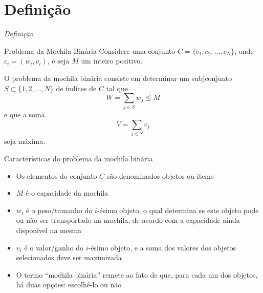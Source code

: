 \section{Definição}

\begin{frame}[fragile]{{\it Definição}}

    \begin{block}{Problema da Mochila Binária}
        Considere uma conjunto $C = \{ c_1, c_2, \ldots, c_N \}$, onde $c_i = (w_i, v_i)$,
        e seja $M$ um inteiro positivo.

        O problema da mochila binária consiste em determinar um subjconjunto $S\subset 
        \{ 1, 2, \ldots, N \}$ de índices de $C$ tal que
        \[
            W = \sum_{j\in S} w_j \leq M
        \]
        e que a soma
        \[
            V = \sum_{j \in S} v_j
        \] seja máxima.
    \end{block}

\end{frame}

\begin{frame}[fragile]{Características do problema da mochila binária}

    \begin{itemize}
        \item Os elementos do conjunto $C$ são denominados objetos ou items

        \item $M$ é o capacidade da mochila

        \item $w_i$ é o peso/tamanho do $i$-ésimo objeto, o qual determina se este objeto pode ou não ser
            transportado na mochila, de acordo com a capacidade ainda disponível na mesma

        \item $v_i$ é o valor/ganho do $i$-ésimo objeto, e a soma dos valores dos objetos selecionados
            deve ser maximizada

        \item O termo ``mochila binária'' remete ao fato de que, para cada um dos objetos,
            há duas opções: escolhê-lo ou não
    \end{itemize}

\end{frame}

